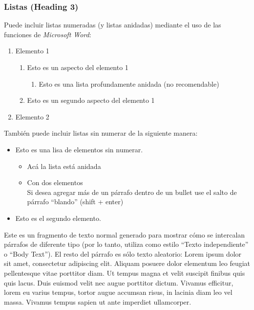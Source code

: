 \documentclass[
    a4paper,%
    DIV=calc,%
    abstract=true%
  ]{scrartcl}%
\providecommand{\tightlist}{%
  \setlength{\itemsep}{0pt}\setlength{\parskip}{0pt}}
\begin{document}
  \subsubsection{Listas (Heading 3)}\label{listas-heading-3}

  Puede incluir listas numeradas (y listas anidadas) mediante el uso de
  las funciones de \emph{Microsoft Word}:

  \begin{enumerate}
  \def\labelenumi{\arabic{enumi}.}
  \item
    Elemento 1

    \begin{enumerate}
    \def\labelenumii{\alph{enumii}.}
    \item
      Esto es un aspecto del elemento 1

      \begin{enumerate}
      \def\labelenumiii{\roman{enumiii}.}
      \tightlist
      \item
        Esto es una lista profundamente anidada (no recomendable)
      \end{enumerate}
    \item
      Esto es un segundo aspecto del elemento 1
    \end{enumerate}
  \item
    Elemento 2
  \end{enumerate}

  También puede incluir listas sin numerar de la siguiente manera:

  \begin{itemize}
  \item
    Esto es una lisa de elementos sin numerar.

    \begin{itemize}
    \item
      Acá la lista está anidada
    \item
      Con dos elementos\\
      Si desea agregar más de un párrafo dentro de un bullet use el
      salto de párrafo ``blando'' (shift + enter)
    \end{itemize}
  \item
    Esto es el segundo elemento.
  \end{itemize}

  Este es un fragmento de texto normal generado para mostrar cómo se
  intercalan párrafos de diferente tipo (por lo tanto, utiliza como
  estilo ``Texto independiente'' o ``Body Text''). El resto del párrafo
  es sólo texto aleatorio: Lorem ipsum dolor sit amet, consectetur
  adipiscing elit. Aliquam posuere dolor elementum leo feugiat
  pellentesque vitae porttitor diam. Ut tempus magna et velit suscipit
  finibus quis quis lacus. Duis euismod velit nec augue porttitor
  dictum. Vivamus efficitur, lorem eu varius tempus, tortor augue
  accumsan risus, in lacinia diam leo vel massa. Vivamus tempus sapien
  ut ante imperdiet ullamcorper.
\end{document}
